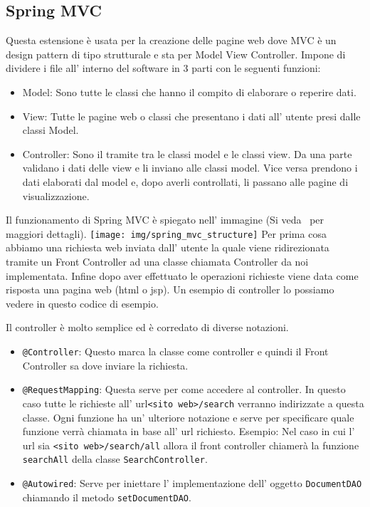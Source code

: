 \documentclass[12pt]{book}
\begin{document}
\subsection{Spring MVC}
Questa estensione è usata per la creazione delle pagine web dove MVC è un design 
pattern di tipo strutturale e sta per Model View Controller.
Impone di dividere i file all' interno del software in 3 parti con le seguenti 
funzioni:
\begin{itemize}
    \item Model: Sono tutte le classi che hanno 
        il compito di elaborare o reperire dati.
    \item View: Tutte le pagine web o classi che presentano
        i dati all' utente presi dalle classi Model.
    \item Controller: Sono il tramite tra le classi model e le classi
        view. Da una parte validano i dati delle view e li inviano alle 
        classi model. Vice versa prendono i dati elaborati dal model e, dopo 
        averli controllati, li passano alle pagine di visualizzazione.
\end{itemize}
Il funzionamento di Spring MVC è spiegato nell' immagine 
(Si veda~\cite{apress:introducing_spring_framework} per maggiori dettagli).
\newline
\texttt{[image: img/spring\_mvc\_structure]}
\newline
Per prima cosa abbiamo una richiesta web inviata dall' utente la quale viene 
ridirezionata tramite un Front Controller ad una classe chiamata Controller da 
noi implementata.
Infine dopo aver effettuato le operazioni richieste viene data come risposta 
una pagina web (html o jsp).
Un esempio di controller lo possiamo vedere in questo codice di esempio.

Il controller è molto semplice ed è corredato di diverse notazioni.
\begin{itemize}
    \item \texttt{@Controller}: Questo marca la classe come controller e quindi
        il Front Controller sa dove inviare la richiesta.
    \item \texttt{@RequestMapping}: Questa serve per come accedere al controller.
        In questo caso tutte le richieste all' url\texttt{<sito web>/search}
        verranno indirizzate a questa classe.
        Ogni funzione ha un' ulteriore notazione e serve per specificare quale
        funzione verrà chiamata in base all' url richiesto.
        Esempio: Nel caso in cui l' url sia \texttt{<sito web>/search/all} 
        allora il front controller chiamerà la funzione \texttt{searchAll}
        della classe \texttt{SearchController}.
    \item \texttt{@Autowired}: Serve per iniettare l' implementazione dell' 
        oggetto \texttt{DocumentDAO} chiamando il metodo 
        \texttt{setDocumentDAO}\@.
\end{itemize}
\end{document}
